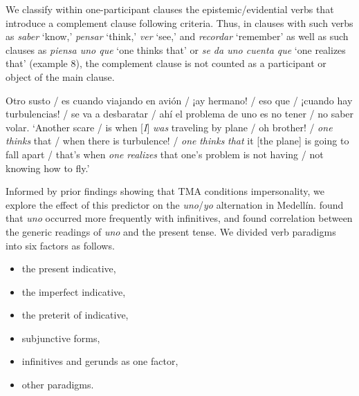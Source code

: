 \documentclass[output=paper]{langscibook}
\begin{document}
We classify within one-participant clauses the epistemic/evidential verbs that introduce a complement clause following  criteria. Thus, in clauses with such verbs as \textit{saber} ‘know,’ \textit{pensar} ‘think,’ \textit{ver} ‘see,’ and \textit{recordar} ‘remember’ as well as such clauses as \textit{piensa uno que} ‘one thinks that’ or \textit{se da uno cuenta que} ‘one realizes that’ (example 8), the complement clause is not counted as a participant or object of the main clause.
 

\eanoraggedright\label{ex:orozco:8}
Otro susto / es cuando  viajando en avión / ¡ay hermano! / eso   que / ¡cuando hay turbulencias! /    se va a desbaratar / ahí      el problema de uno es no tener / no saber volar.  
\glt ‘Another scare / is when [\textit{I}] \textit{was} traveling by plane / oh brother! / \textit{one} \textit{thinks} that / when there is turbulence! / \textit{one} \textit{thinks} \textit{that} it [the plane] is going to fall apart / that's when \textit{one} \textit{realizes} that one’s problem is not having / not knowing how to fly.’
\z 

\label{sec:orozco:3.3.2.2}



Informed by prior findings showing that TMA conditions impersonality, we explore the effect of this predictor on the \textit{uno}/\textit{yo} alternation in Medellín. \citet[1819]{Flores-Ferrán2009} found that \textit{uno} occurred more frequently with infinitives, and \citet[203]{DeCock2014} found correlation between the generic readings of \textit{uno} and the present tense. We divided verb paradigms into six factors as follows. 

\begin{itemize}
    \item the present indicative, 
    \item the imperfect indicative, 
    \item the preterit of indicative, 
    \item subjunctive forms, 
    \item infinitives and gerunds as one factor,
    \item other paradigms.   
\end{itemize}
\end{document}
